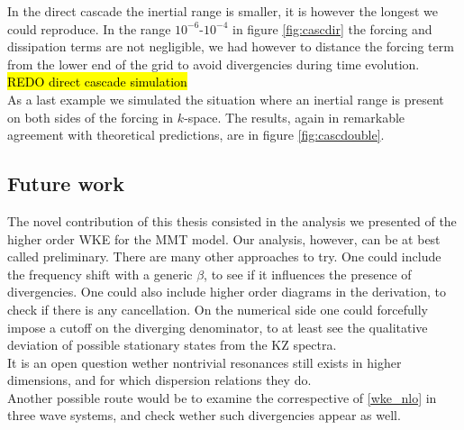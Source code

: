     In the direct cascade the inertial range is smaller, it is however the longest we could reproduce. In the range $10^{-6}$-$10^{-4}$ in figure \ref{fig:cascdir}  the forcing and dissipation terms are not negligible, we had however to distance the forcing term from the lower end of the grid to avoid divergencies during time evolution. \\
    \hl{REDO direct cascade simulation} \\
    As a last example we simulated the situation where an inertial range is present on both sides of the forcing in $k$-space. The results, again in remarkable agreement with theoretical predictions, are in figure \ref{fig:cascdouble}. \\
    \subsection{Future work}

    The novel contribution of this thesis consisted in the analysis we presented of the higher order WKE for the MMT model. 
    Our analysis, however, can be at best called preliminary. There are many other approaches to try. One could include the frequency shift with a generic $\beta$, to see if it influences the presence of divergencies. One could also include higher order diagrams in the derivation, to check if there is any cancellation. On the numerical side one could forcefully impose a cutoff on the diverging denominator, to at least see the qualitative deviation of possible stationary states from the KZ spectra.\\
    It is an open question wether nontrivial resonances still exists in higher dimensions, and for which dispersion relations they do.\\
    Another possible route would be to examine the correspective of \eqref{wke_nlo} in three wave systems, and check wether such divergencies appear as well. 

    
